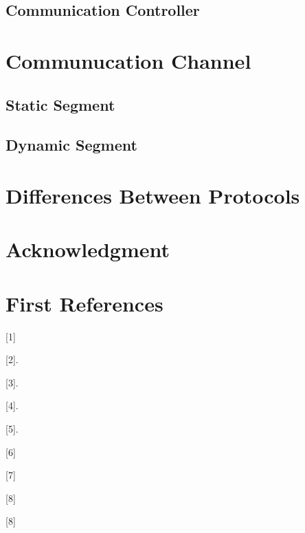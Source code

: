 \documentclass[conference]{IEEEtran}
\begin{document}
\subsection{Communication Controller}

\section{Communucation Channel}


\subsection{Static Segment}

\subsection{Dynamic Segment}

\section{Differences Between Protocols}

\section*{Acknowledgment}

\section{First References}
[1]\cite{reichart2005flexray}

[2]\cite{vaz2020efficient}.

[3]\cite{steinbach2010comparing}.

[4]\cite{makowitz2006flexray}.

[5]\cite{enosh2014efficient}.

[6]\cite{kopetz2001comparison}

[7]\cite{shaw2008introduction}

[8]\cite{rausch2007flexray}

[8]\cite{xu2008implementation}


\end{document}
